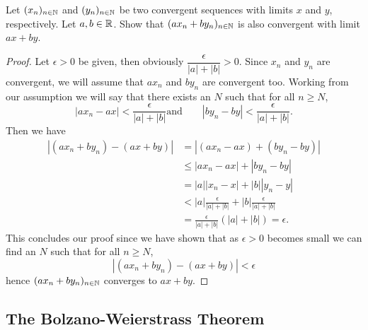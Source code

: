 \documentclass[10pt, a4paper]{article}
\begin{document}
\begin{example}
    Let $(x_n)_{n \in \mathbb{N}}$ and $(y_n)_{n \in \mathbb{N}}$ be two convergent sequences with limits $x$ and $y$, respectively. Let $a, b \in \mathbb{R}$. Show that $(ax_n + by_n)_{n \in \mathbb{N}}$ is also convergent with limit $ax + by$.
    \begin{proof}
        Let $\epsilon > 0$ be given, then obviously $\dfrac{\epsilon}{|a| + |b|} > 0$. Since $x_n$ and $y_n$ are convergent, we will assume that $ax_n$ and $by_n$ are convergent too. Working from our assumption we will say that there exists an $N$ such that for all $n \geq N$,
        \[
        |ax_n - ax| < \frac{\epsilon}{|a| + |b|}\text{and}\qquad|by_n - by| < \frac{\epsilon}{|a| + |b|}.
        \]
        Then we have
        \begin{align*}
            |(ax_n + by_n) - (ax + by)| &= |(ax_n - ax) + (by_n - by)| \\
            &\leq |ax_n - ax| + |by_n - by| \\
            &= |a||x_n - x| + |b||y_n - y| \\
            &< |a|\frac{\epsilon}{|a| + |b|} + |b|\frac{\epsilon}{|a| + |b|} \\
            &= \frac{\epsilon}{|a| + |b|}\left(|a| + |b|\right) = \epsilon.
        \end{align*}
        This concludes our proof since we have shown that as $\epsilon > 0$ becomes small we can find an $N$ such that for all $n \geq N$,
        \[
        |(ax_n + by_n) - (ax + by)| < \epsilon
        \]
        hence $(ax_n + by_n)_{n \in \mathbb{N}}$ converges to $ax + by$.
    \end{proof}
\end{example}

\subsection{The Bolzano-Weierstrass Theorem}
\end{document}
